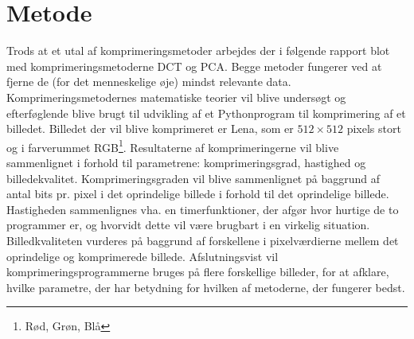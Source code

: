 

\section{Metode}
Trods at et utal af komprimeringsmetoder arbejdes der i følgende rapport blot med komprimeringsmetoderne DCT og PCA. Begge metoder fungerer ved at fjerne de (for det menneskelige øje) mindst relevante data. Komprimeringsmetodernes matematiske teorier vil blive undersøgt og efterføglende blive brugt til udvikling af et Pythonprogram til komprimering af et billedet. Billedet der vil blive komprimeret er Lena, som er $512 \times 512$ pixels stort og i farverummet RGB\footnote{Rød, Grøn, Blå}. Resultaterne af komprimeringerne vil blive sammenlignet i forhold til parametrene: komprimeringsgrad, hastighed og billedekvalitet. Komprimeringsgraden vil blive sammenlignet på baggrund af antal bits pr. pixel i det oprindelige billede i forhold til det oprindelige billede. Hastigheden sammenlignes vha. en timerfunktioner, der afgør hvor hurtige de to programmer er, og hvorvidt dette vil være brugbart i en virkelig situation. Billedkvaliteten vurderes på baggrund af forskellene i pixelværdierne mellem det oprindelige og komprimerede billede. Afslutningsvist vil komprimeringsprogrammerne bruges på flere forskellige billeder, for at afklare, hvilke parametre, der har betydning for hvilken af metoderne, der fungerer bedst.

